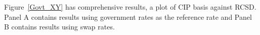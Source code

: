 



 





 


 

Figure~\ref{Govt_XY} has comprehensive results, a plot of CIP basis against RCSD.  Panel A contains results using government rates as the reference rate and Panel B contains results using swap rates.

